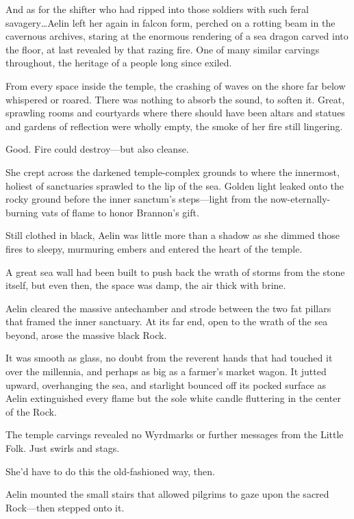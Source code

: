 And as for the shifter who had ripped into those soldiers with such feral savagery\ldots Aelin left her again in falcon form, perched on a rotting beam in the cavernous archives, staring at the enormous rendering of a sea dragon carved into the floor, at last revealed by that razing fire.
One of many similar carvings throughout, the heritage of a people long since exiled.

From every space inside the temple, the crashing of waves on the shore far below whispered or roared.
There was nothing to absorb the sound, to soften it.
Great, sprawling rooms and courtyards where there should have been altars and statues and gardens of reflection were wholly empty, the smoke of her fire still lingering.

Good.
Fire could destroy---but also cleanse.

She crept across the darkened temple-complex grounds to where the innermost, holiest of sanctuaries sprawled to the lip of the sea.
Golden light leaked onto the rocky ground before the inner sanctum's steps---light from the now-eternally-burning vats of flame to honor Brannon's gift.

Still clothed in black, Aelin was little more than a shadow as she dimmed those fires to sleepy, murmuring embers and entered the heart of the temple.

A great sea wall had been built to push back the wrath of storms from the stone itself, but even then, the space was damp, the air thick with brine.

Aelin cleared the massive antechamber and strode between the two fat pillars that framed the inner sanctuary.
At its far end, open to the wrath of the sea beyond, arose the massive black Rock.

It was smooth as glass, no doubt from the reverent hands that had touched it over the millennia, and perhaps as big as a farmer's market wagon.
It jutted upward, overhanging the sea, and starlight bounced off its pocked surface as Aelin extinguished every flame but the sole white candle fluttering in the center of the Rock.

The temple carvings revealed no Wyrdmarks or further messages from the Little Folk.
Just swirls and stags.

She'd have to do this the old-fashioned way, then.

Aelin mounted the small stairs that allowed pilgrims to gaze upon the sacred Rock---then stepped onto it.
